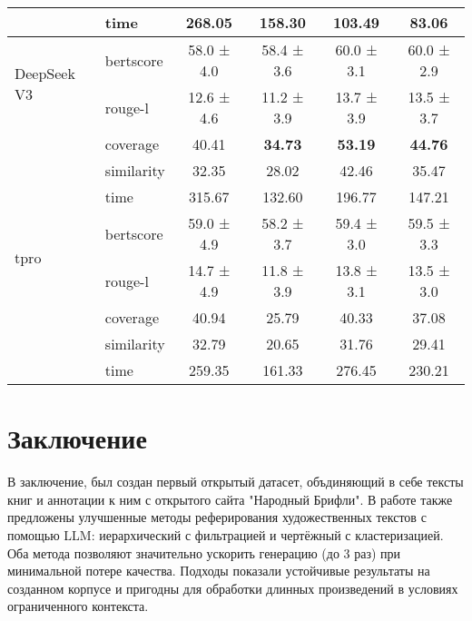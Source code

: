 \documentclass{article}
\theoremstyle{definition}
\theoremstyle{plain}
\begin{document}
\begin{table}[ht]
\begin{tabular}{llcccc}
 & time & 268.05 & 158.30 & 103.49 & 83.06 \\
\midrule
\multirow{2}{*}{DeepSeek V3}
 & bertscore & 58.0 ± 4.0 & 58.4 ± 3.6 & 60.0 ± 3.1 & 60.0 ± 2.9 \\
 & rouge-l & 12.6 ± 4.6 & 11.2 ± 3.9 & 13.7 ± 3.9 & 13.5 ± 3.7 \\
 & coverage & 40.41 & \textbf{34.73} & \textbf{53.19} & \textbf{44.76}\\
 & similarity & 32.35 & 28.02 & 42.46 & 35.47\\
 & time & 315.67 & 132.60 & 196.77 & 147.21 \\
\midrule
\multirow{2}{*}{tpro}
 & bertscore & 59.0 ± 4.9 & 58.2 ± 3.7 & 59.4 ± 3.0 & 59.5 ± 3.3 \\
 & rouge-l & 14.7 ± 4.9 & 11.8 ± 3.9 & 13.8 ± 3.1 & 13.5 ± 3.0 \\
 & coverage & 40.94 & 25.79 & 40.33 & 37.08 \\
 & similarity & 32.79 & 20.65 & 31.76 & 29.41 \\
 & time & 259.35 & 161.33 & 276.45 & 230.21 \\ 
\bottomrule
\end{tabular}
\end{table}
\FloatBarrier
\section*{Заключение}
В заключение, был создан первый открытый датасет, объдиняющий в себе тексты книг и аннотации к ним с открытого сайта "Народный Брифли".
В работе также предложены улучшенные методы реферирования художественных текстов с помощью LLM: 
иерархический с фильтрацией и чертёжный с кластеризацией.
Оба метода позволяют значительно ускорить генерацию (до 3 раз) при минимальной потере качества. 
Подходы показали устойчивые результаты на созданном корпусе и пригодны для обработки длинных произведений в условиях ограниченного контекста.
\end{document}
